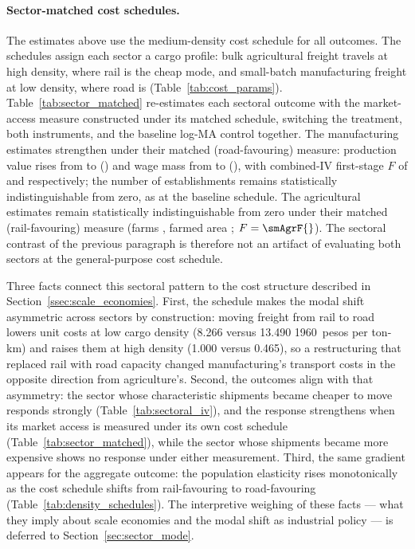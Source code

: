 \paragraph{Sector-matched cost schedules.}
The estimates above use the medium-density cost schedule for all
outcomes. The \citet{baumgartnerpalazzo1969} schedules assign each
sector a cargo profile: bulk agricultural freight travels at high
density, where rail is the cheap mode, and small-batch manufacturing
freight at low density, where road is
(Table~\ref{tab:cost_params}). Table~\ref{tab:sector_matched}
re-estimates each sectoral outcome with the market-access measure
constructed under its matched schedule, switching the treatment, both
instruments, and the baseline log-MA control together. The
manufacturing estimates strengthen under their matched
(road-favouring) measure: production value rises from
\mfgValprodCoefIVBoth{} to \smValprodIVBCoef{} (\smValprodIVBSE{}) and
wage mass from \mfgWageMassCoefIVBoth{} to \smMassalIVBCoef{}
(\smMassalIVBSE{}), with combined-IV first-stage $F$ of \smMfgF{} and
\smMassalF{} respectively; the number of establishments remains
statistically indistinguishable from zero, as at the baseline
schedule. The
agricultural estimates remain statistically indistinguishable from
zero under their matched (rail-favouring) measure (farms
\smNexpIVBCoef{}, farmed area \smAreaIVBCoef{}; $F = \smAgrF{}$). The
sectoral contrast of the previous paragraph is therefore not an
artifact of evaluating both sectors at the general-purpose cost
schedule.



Three facts connect this sectoral pattern to the cost structure
described in Section~\ref{ssec:scale_economies}. First, the
\citet{baumgartnerpalazzo1969} schedule makes the modal shift
asymmetric across sectors by construction: moving freight from rail
to road lowers unit costs at low cargo density (8.266 versus 13.490
1960~pesos per ton-km) and raises them at high density (1.000 versus
0.465), so a restructuring that replaced rail with road capacity
changed manufacturing's transport costs in the opposite direction
from agriculture's. Second, the outcomes align with that asymmetry:
the sector whose characteristic shipments became cheaper to move
responds strongly (Table~\ref{tab:sectoral_iv}), and the response
strengthens when its market access is measured under its own cost
schedule (Table~\ref{tab:sector_matched}), while the sector whose
shipments became more expensive shows no response under either
measurement. Third, the same gradient appears for the aggregate
outcome: the population elasticity rises monotonically as the cost
schedule shifts from rail-favouring to road-favouring
(Table~\ref{tab:density_schedules}). The interpretive weighing of
these facts --- what they imply about scale economies and the modal
shift as industrial policy --- is deferred to
Section~\ref{sec:sector_mode}.

